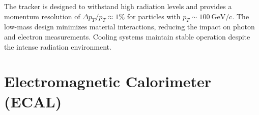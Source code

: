 The tracker is designed to withstand high radiation levels and provides a momentum resolution of $\Delta p_T / p_T \approx 1\%$ for particles with $p_T \sim 100~\mathrm{GeV/c}$. The low-mass design minimizes material interactions, reducing the impact on photon and electron measurements. Cooling systems maintain stable operation despite the intense radiation environment.

\section{Electromagnetic Calorimeter (ECAL)}








